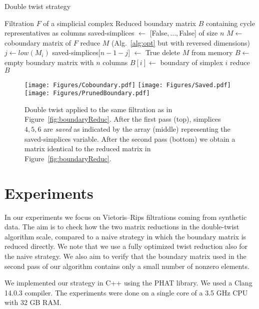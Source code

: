 \begin{algorithm}
\caption{Double twist strategy}
\label{alg:doubletwist}
\begin{algorithmic}[1]
\Require Filtration $F$ of a simplicial complex
\Ensure Reduced boundary matrix $B$ containing cycle representatives as columns
\State saved-simplices $\gets$ [False$,\dots,$False] of size $n$
\State $M \gets $ coboundary matrix of $F$
\State reduce $M$ (Alg.~\ref{alg:opt} but with reversed dimensions)
 \label{line:from_save}
        \State $j \gets low(M_i)$
        \State saved-simplices[$n-1-j$] $\gets$ True
    \EndIf
\EndFor \label{line:to_save}
\State delete $M$ from memory
\State $B \gets$ empty boundary matrix with $n$ columns
     
        \State $B[i] \gets$  boundary of simplex $i$        
    \EndIf    
\EndFor
\State reduce $B$
\end{algorithmic}
\end{algorithm}

\begin{figure}
    \centering
    \texttt{[image: Figures/Coboundary.pdf]}
    \texttt{[image: Figures/Saved.pdf]}\hfill
    \texttt{[image: Figures/PrunedBoundary.pdf]}    
    \caption{Double twist applied to the same filtration as in Figure~\ref{fig:boundaryReduc}. After the first pass (top), simplices $4,5,6$ are \emph{saved} as indicated by the array (middle) representing the saved-simplices variable. After the second pass (bottom) we obtain a matrix identical to the reduced matrix in Figure~\ref{fig:boundaryReduc}.}
    \label{fig:doubletwist}
\end{figure}


\section{Experiments}
\label{sec:experiments}


In our experiments we focus on Vietoris--Rips filtrations coming from synthetic data.
The aim is to check how the two matrix reductions in the double-twist algorithm scale, compared to a naive strategy in which the boundary matrix is reduced directly. We note that we use a fully optimized twist reduction also for the naive strategy. We also aim to verify that the boundary matrix used in the second pass of our algorithm contains only a small number of nonzero elements.

We implemented our strategy in C++ using the PHAT library. We used a {Clang 14.0.3} compiler. The experiments were done on a single core of a 3.5 GHz CPU with 32 GB RAM.

